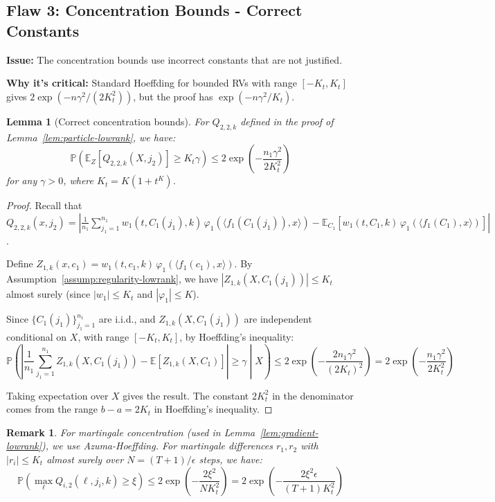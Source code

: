 \documentclass[11pt]{article}
\newcommand{\1}{\mathbbm{1}}
\newtheorem{lemma}{Lemma}
\newtheorem{remark}{Remark}
\begin{document}
\subsection{Flaw 3: Concentration Bounds - Correct Constants}

\textbf{Issue:} The concentration bounds use incorrect constants that are not justified.

\textbf{Why it's critical:} Standard Hoeffding for bounded RVs with range $[-K_t, K_t]$ gives $2\exp(-n\gamma^2/(2K_t^2))$, but the proof has $\exp(-n\gamma^2/K_t)$.

\begin{lemma}[Correct concentration bounds]
\label{lem:concentration-correct}
For $Q_{2,2,k}$ defined in the proof of Lemma~\ref{lem:particle-lowrank}, we have:
\[
\mathbb{P}\left(\mathbb{E}_Z[Q_{2,2,k}(X, j_2)] \ge K_t\gamma\right) \le 2\exp\left(-\frac{n_1\gamma^2}{2K_t^2}\right)
\]
for any $\gamma > 0$, where $K_t = K(1+t^K)$.
\end{lemma}

\begin{proof}
Recall that $Q_{2,2,k}(x, j_2) = \left|\frac{1}{n_1}\sum_{j_1=1}^{n_1}w_1(t, C_1(j_1), k)\,\varphi_1(\langle f_1(C_1(j_1)), x\rangle) - \mathbb{E}_{C_1}[w_1(t, C_1, k)\,\varphi_1(\langle f_1(C_1), x\rangle)]\right|$.

Define $Z_{1,k}(x, c_1) = w_1(t, c_1, k)\,\varphi_1(\langle f_1(c_1), x\rangle)$. By Assumption~\ref{assump:regularity-lowrank}, we have $|Z_{1,k}(X, C_1(j_1))| \le K_t$ almost surely (since $|w_1| \le K_t$ and $|\varphi_1| \le K$).

Since $\{C_1(j_1)\}_{j_1=1}^{n_1}$ are i.i.d., and $Z_{1,k}(X, C_1(j_1))$ are independent conditional on $X$, with range $[-K_t, K_t]$, by Hoeffding's inequality:
\[
\mathbb{P}\left(\left|\frac{1}{n_1}\sum_{j_1=1}^{n_1} Z_{1,k}(X, C_1(j_1)) - \mathbb{E}[Z_{1,k}(X, C_1)]\right| \ge \gamma \middle| X\right) \le 2\exp\left(-\frac{2n_1\gamma^2}{(2K_t)^2}\right) = 2\exp\left(-\frac{n_1\gamma^2}{2K_t^2}\right)
\]

Taking expectation over $X$ gives the result. The constant $2K_t^2$ in the denominator comes from the range $b-a = 2K_t$ in Hoeffding's inequality.
\end{proof}

\begin{remark}
For martingale concentration (used in Lemma~\ref{lem:gradient-lowrank}), we use Azuma-Hoeffding. For martingale differences $r_1, r_2$ with $|r_i| \le K_t$ almost surely over $N = (T+1)/\epsilon$ steps, we have:
\[
\mathbb{P}\left(\max_{\ell} Q_{i,2}(\ell, j_i, k) \ge \xi\right) \le 2\exp\left(-\frac{2\xi^2}{N K_t^2}\right) = 2\exp\left(-\frac{2\xi^2\epsilon}{(T+1)K_t^2}\right)
\]
\end{remark}
\end{document}
